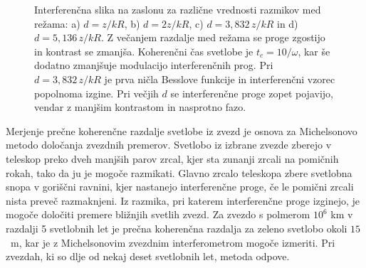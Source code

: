 \begin{figure}[h]
\begin{center}
\def\svgwidth{0.37\textwidth} 

\def\svgwidth{0.37\textwidth} 

\def\svgwidth{0.37\textwidth} 

\def\svgwidth{0.37\textwidth} 

\caption{Interferenčna slika na zaslonu
za različne vrednosti razmikov med režama: a) $d = z/kR$, b) $d=2z/kR$, 
c) $d = 3,832\,z/kR$ in d) $d = 5,136\,z/kR$. 
Z večanjem razdalje med režama se proge zgostijo in kontrast se zmanjša. Koherenčni
čas svetlobe je $t_{c}=10/\omega$, kar še dodatno zmanjšuje modulacijo
interferenčnih prog. Pri $d=3,832\,z/kR$ je prva ničla Besslove
funkcije in interferenčni vzorec popolnoma izgine. Pri večjih $d$ se interferenčne
proge zopet pojavijo, vendar z manjšim kontrastom in nasprotno fazo.}
\label{fig:Interferencna-slika}
\end{center}
\end{figure}

\begin{remark}
Merjenje prečne koherenčne razdalje svetlobe iz
zvezd je osnova za Michelsonovo metodo določanja zvezdnih premerov.
Svetlobo iz izbrane zvezde zberejo v teleskop preko dveh manjših parov
zrcal, kjer sta zunanji zrcali na pomičnih rokah, tako da ju je mogoče
razmikati. Glavno zrcalo teleskopa zbere svetlobna snopa v goriščni
ravnini, kjer nastanejo interferenčne proge, če le pomični zrcali
nista preveč razmaknjeni. Iz razmika, pri katerem interferenčne proge
izginejo, je mogoče določiti premere bližnjih svetlih zvezd. Za zvezdo
s polmerom $10^{6}$ km v razdalji 5 svetlobnih let je prečna koherenčna
razdalja za zeleno svetlobo okoli $15$~m, kar je z Michelsonovim
zvezdnim interferometrom mogoče izmeriti. Pri zvezdah, ki so dlje
od nekaj deset svetlobnih let, metoda odpove.
\end{remark}

